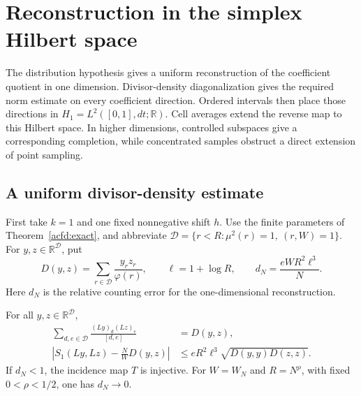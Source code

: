 \section{Reconstruction in the simplex Hilbert space}
\label{acfr:section}

The distribution hypothesis gives a uniform reconstruction of the coefficient
quotient in one dimension.
Divisor-density diagonalization gives the required norm estimate on every
coefficient direction.  Ordered intervals then place those directions in
$H_1=L^2([0,1],dt;\mathbb R)$.
Cell averages extend the reverse map to this Hilbert space.
In higher dimensions, controlled subspaces give a corresponding completion,
while concentrated samples obstruct a direct extension of point sampling.

\subsection{A uniform divisor-density estimate}

First take $k=1$ and one fixed nonnegative shift $h$.
Use the finite parameters of Theorem~\ref{acfd:exact}, and abbreviate
$\mathcal D=\{r<R:\mu^2(r)=1,\ (r,W)=1\}$.
For $y,z\in\mathbb R^{\mathcal D}$, put
\[
 D(y,z)=\sum_{r\in\mathcal D}\frac{y_rz_r}{\varphi(r)},\qquad
 \ell=1+\log R,\qquad d_N=\frac{eWR^2\ell^3}{N}.
\]
Here $d_N$ is the relative counting error for the one-dimensional reconstruction.

\begin{proposition}
For\label{acfr:density} all $y,z\in\mathbb R^{\mathcal D}$,
\begin{align}
 \sum_{d,e\in\mathcal D}\frac{(Ly)_d(Lz)_e}{[d,e]}
       &=D(y,z),\label{acfr:diagonal}\\
 \left|S_1(Ly,Lz)-\frac NW D(y,z)\right|
       &\leq eR^2\ell^3\sqrt{D(y,y)D(z,z)}.\label{acfr:relative-mass}
\end{align}
If $d_N<1$, the incidence map $T$ is injective.
For $W=W_N$ and $R=N^\rho$, with fixed $0<\rho<1/2$, one has $d_N\to0$.
\end{proposition}


